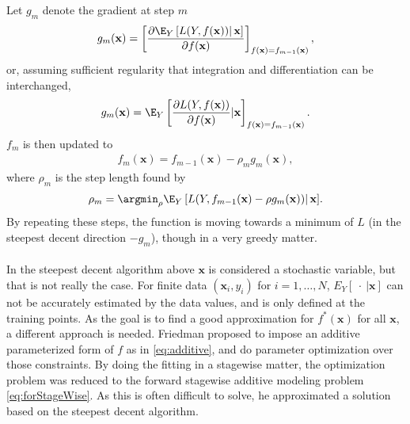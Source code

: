 Let $g_m$ denote the gradient at step $m$
\begin{align}
  g_{m}(\mathbf{x}) = \left[ \frac{\partial \E_{Y} \left[ L(Y, f(\mathbf{x})) \right | \mathbf{x}]}{\partial f(\mathbf{x})}  \right]_{f(\mathbf{x}) = f_{m-1}(\mathbf{x})},
\end{align}
or, assuming sufficient regularity that integration and differentiation can be interchanged, 
\begin{align}
  g_{m}(\mathbf{x}) = \E_{Y} \left[ \frac{\partial L(Y, f(\mathbf{x})) }{\partial f(\mathbf{x})}  | \mathbf{x}\right]_{f(\mathbf{x}) = f_{m-1}(\mathbf{x})}.
\end{align}
$f_m$ is then updated to
\begin{align}
  f_m(\mathbf{x}) = f_{m-1}(\mathbf{x}) - \rho_m  g_m(\mathbf{x}),
\end{align}
where $\rho_m$ is the step length found by
\begin{align}
  \rho_m = \argmin_{\rho}  \E_{Y} \left[ L(Y, f_{m-1}(\mathbf{x}) - \rho g_m(\mathbf{x})) \right | \mathbf{x}].
\end{align}
By repeating these steps, the function is moving towards a minimum of $L$ (in the steepest decent direction $-g_m$), though in a very greedy matter. \\
\\
In the steepest decent algorithm above $\mathbf{x}$ is considered a stochastic variable, but that is not really the case. For finite data $(\mathbf{x}_i, y_i)$ for $i = 1, \ldots, N$, $E_Y \left[\: \cdot \:| \mathbf{x} \right]$ can not be accurately estimated by the data values, and is only defined at the training points. As the goal is to find a good approximation for $f^*(\mathbf{x})$ for all $\mathbf{x}$, a different approach is needed. Friedman proposed to impose an additive parameterized form of $f$ as in \eqref{eq:additive}, and do parameter optimization over those constraints. By doing the fitting in a stagewise matter, the optimization problem was reduced to the forward stagewise additive modeling problem \eqref{eq:forStageWise}. As this is often difficult to solve, he approximated a solution based on the steepest decent algorithm.

